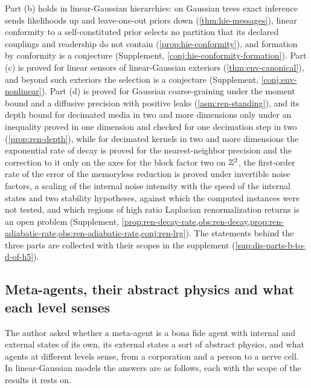 Part (b) holds in linear-Gaussian hierarchies: on Gaussian trees exact inference sends likelihoods up and leave-one-out priors down (\cref{thm:hie-messages}), linear conformity to a self-constituted prior selects no partition that its declared couplings and readership do not contain (\cref{prop:hie-conformity}), and formation by conformity is a conjecture (Supplement, \cref{conj:hie-conformity-formation}). Part (c) is proved for linear sensors of linear-Gaussian exteriors (\cref{thm:env-canonical}), and beyond such exteriors the selection is a conjecture (Supplement, \cref{conj:env-nonlinear}). Part (d) is proved for Gaussian coarse-graining under the moment bound and a diffusive precision with positive leaks (\cref{asm:ren-standing}), and its depth bound for decimated media in two and more dimensions only under an inequality proved in one dimension and checked for one decimation step in two (\cref{prop:ren-depth}), while for decimated kernels in two and more dimensions the exponential rate of decay is proved for the nearest-neighbor precision and the correction to it only on the axes for the block factor two on $\mathbb{Z}^2$, the first-order rate of the error of the memoryless reduction is proved under invertible noise factors, a scaling of the internal noise intensity with the speed of the internal states and two stability hypotheses, against which the computed instances were not tested, and which regions of high ratio Laplacian renormalization returns is an open problem (Supplement, \cref{prop:ren-decay-rate,obs:ren-decay,prop:ren-adiabatic-rate,obs:ren-adiabatic-rate,conj:ren-lrg}). The statements behind the three parts are collected with their scopes in the supplement (\cref{sup:dis-parts-b-to-d-of-h5}).

\subsection{Meta-agents, their abstract physics and what each level senses}\label{sec:dis-meta}

The author asked whether a meta-agent is a bona fide agent with internal and external states of its own, its external states a sort of abstract physics, and what agents at different levels sense, from a corporation and a person to a nerve cell. In linear-Gaussian models the answers are as follows, each with the scope of the results it rests on.

